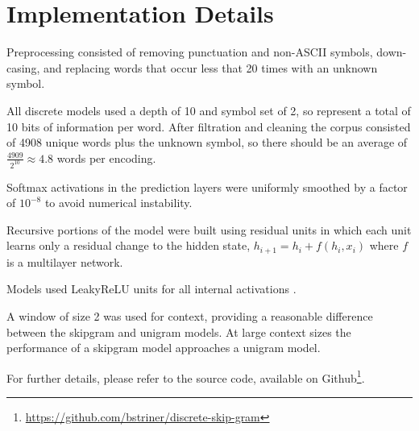 \documentclass[sigconf]{acmart}
\begin{document}
\section{Implementation Details}

Preprocessing consisted of removing punctuation and non-ASCII symbols, down-casing, and replacing words that occur less that 20 times with an unknown symbol.

All discrete models used a depth of 10 and symbol set of 2, so represent a total of 10 bits of information per word. After filtration and cleaning the corpus consisted of 4908 unique words plus the unknown symbol, so there should be an average of $\frac{4909}{2^{10}} \approx 4.8$ words per encoding.

Softmax activations in the prediction layers were uniformly smoothed by a factor of $10^{-8}$ to avoid numerical instability.

Recursive portions of the model were built using residual units \cite{DBLP:journals/corr/HeZRS15} in which each unit learns only a residual change to the hidden state,
$h_{i+1} = h_i + f(h_i, x_i)$ where $f$ is a multilayer network.

Models used LeakyReLU units for all internal activations \cite{Maas2013} \cite{DBLP:journals/corr/XuWCL15}.

A window of size 2 was used for context, providing a reasonable difference between the skipgram and unigram models. At large context sizes the performance of a skipgram model approaches a unigram model.

For further details, please refer to the source code, available on Github\footnote{\url{https://github.com/bstriner/discrete-skip-gram}}.

\nocite{*}


 
\end{document}
